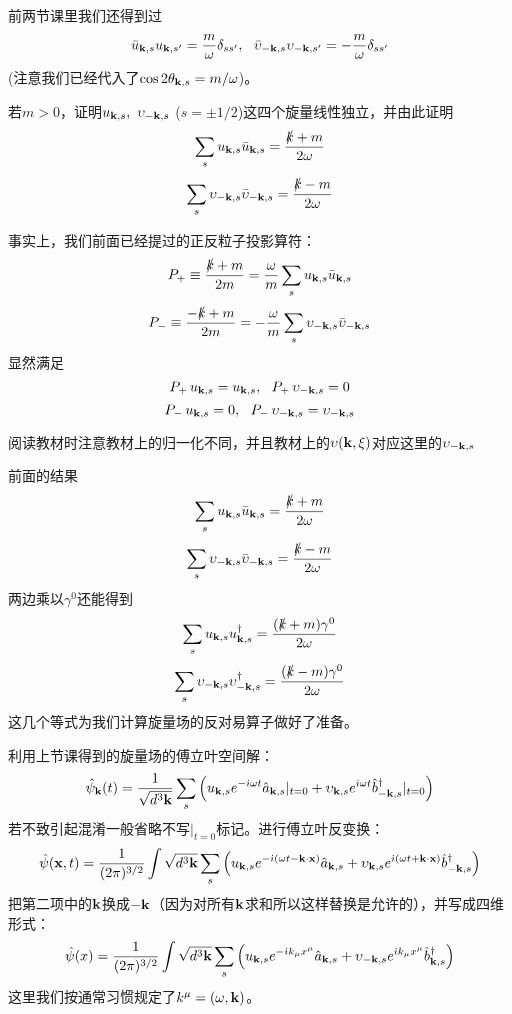 \documentclass[CJK]{beamer}
\begin{document}
\begin{frame}
\bch
前两节课里我们还得到过
$$\bar{u}_{\veck,s} u_{\veck,s'} = \frac{m}{\omega} \delta_{ss'},\ \ \bar{\upsilon}_{-\veck,s} \upsilon_{-\veck,s'} = -\frac{m}{\omega} \delta_{ss'}$$
(注意我们已经代入了$\cos{2\theta_{{\mathbf{k}},s}} = m/\omega$)。

\skipline
若$m > 0$，证明$u_{{\mathbf{k}},s},\ \upsilon_{-{\mathbf{k}},s}$ ($s=\pm 1/2$)这四个旋量线性独立，并由此证明
$$\sum_s u_{{\mathbf{k}},s}\bar{u}_{{\mathbf{k}},s} = \frac{\slashed{k}+m}{2\omega}$$
$$\sum_s \upsilon_{-{\mathbf{k}},s}\bar{\upsilon}_{-{\mathbf{k}},s} = \frac{\slashed{k}-m}{2\omega}$$

\ech
\end{frame}


\begin{frame}
\bch
事实上，我们前面已经提过的正反粒子投影算符：
$$P_+ \equiv \frac{\slashed{k}+m}{2m} = \frac{\omega}{m}\sum_s u_{{\mathbf{k}},s}\bar{u}_{{\mathbf{k}},s} $$
$$P_-\equiv \frac{-\slashed{k}+m}{2m} = -\frac{\omega}{m}\sum_s \upsilon_{-{\mathbf{k}},s}\bar{\upsilon}_{-{\mathbf{k}},s} $$
显然满足
$$P_+\, u_{{\mathbf{k}},s} = u_{{\mathbf{k}},s},\ \ P_+\, \upsilon_{-{\mathbf{k}},s} = 0$$
$$P_-\, u_{{\mathbf{k}},s} = 0,\ \ P_-\, \upsilon_{-{\mathbf{k}},s} = \upsilon_{-{\mathbf{k}},s}$$
\skipline

阅读教材时注意教材上的归一化不同，并且教材上的$\upsilon({\mathbf{k}},\xi)$对应这里的$\upsilon_{-{\mathbf{k}},s}$
\ech
\end{frame}

\begin{frame}
\bch
前面的结果
$$\sum_s u_{{\mathbf{k}},s}\bar{u}_{{\mathbf{k}},s} = \frac{\slashed{k}+m}{2\omega}$$
$$\sum_s \upsilon_{-{\mathbf{k}},s}\bar{\upsilon}_{-{\mathbf{k}},s} = \frac{\slashed{k}-m}{2\omega}$$
两边乘以$\gamma^0$还能得到
$$\sum_s u_{{\mathbf{k}},s}u^\dagger_{{\mathbf{k}},s} = \frac{(\slashed{k}+m)\gamma^0}{2\omega}$$
$$\sum_s \upsilon_{-{\mathbf{k}},s}\upsilon^\dagger_{-{\mathbf{k}},s} = \frac{(\slashed{k}-m)\gamma^0}{2\omega}$$
这几个等式为我们计算旋量场的反对易算子做好了准备。

\ech
\end{frame}

\begin{frame}
\bch
利用上节课得到的旋量场的傅立叶空间解：
$$\hat\psi_{{\mathbf{k}}}(t) = \frac{1}{\sqrt{d^3{\mathbf{k}}}} \sum_{s} \left(u_{{\mathbf{k}},s}e^{-{\dot{\imath}} \omega t}{\hat{a}}_{{\mathbf{k}},s}|_{t=0} + \upsilon_{{\mathbf{k}},s}e^{{\dot{\imath}} \omega t}{\hat{b}^\dagger}_{-{\mathbf{k}},s}|_{t=0}\right)$$
若不致引起混淆一般省略不写$|_{t=0}$标记。进行傅立叶反变换：
$$\hat\psi({\mathbf{x}},t) = \frac{1}{(2\pi)^{3/2}}\int \sqrt{d^3{\mathbf{k}}} \sum_s \left(u_{{\mathbf{k}},s}e^{-{\dot{\imath}}(\omega t-{\mathbf{k}}\cdot{\mathbf{x}})} {\hat{a}}_{{\mathbf{k}},s} + \upsilon_{{\mathbf{k}},s}e^{{\dot{\imath}}(\omega t+{\mathbf{k}}\cdot{\mathbf{x}})} {\hat{b}^\dagger}_{-{\mathbf{k}},s}\right)$$
把第二项中的${\mathbf{k}}$换成$-{\mathbf{k}}$（因为对所有${\mathbf{k}}$求和所以这样替换是允许的），并写成四维形式：
$$\hat\psi(x) = \frac{1}{(2\pi)^{3/2}}\int \sqrt{d^3{\mathbf{k}}} \sum_s \left(u_{{\mathbf{k}},s}e^{-{\dot{\imath}} k_\mu x^\mu} {\hat{a}}_{{\mathbf{k}},s} + \upsilon_{-{\mathbf{k}},s}e^{{\dot{\imath}} k_\mu x^\mu} {\hat{b}^\dagger}_{{\mathbf{k}},s}\right)$$
这里我们按通常习惯规定了$k^\mu = (\omega, {\mathbf{k}})$。
\ech
\end{frame}
\end{document}
